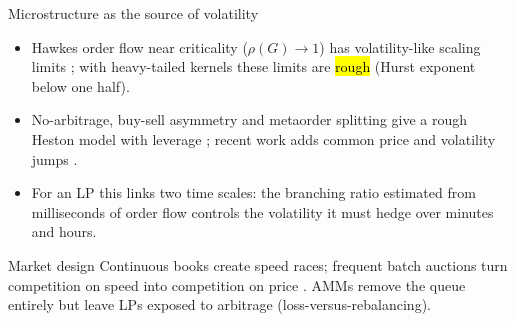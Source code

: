 \begin{frame}{Microstructure as the source of volatility}
  \small
  \begin{itemize}
    \item Hawkes order flow near criticality ($\rho(G)\to 1$) has volatility-like scaling limits \citep{jaisson2015limit}; with heavy-tailed kernels these limits are \hl{rough} (Hurst exponent below one half).
    \item No-arbitrage, buy-sell asymmetry and metaorder splitting give a rough Heston model with leverage \citep{eleuch2018microstructural}; recent work adds common price and volatility jumps \citep{wang2026rough}.
    \item For an LP this links two time scales: the branching ratio estimated from milliseconds of order flow controls the volatility it must hedge over minutes and hours.
  \end{itemize}
  \vspace{0.5em}
  \begin{alertblock}{Market design}
    Continuous books create speed races; frequent batch auctions turn competition on speed into competition on price \citep{budish2015high}. AMMs remove the queue entirely but leave LPs exposed to arbitrage (loss-versus-rebalancing).
  \end{alertblock}
\end{frame}
